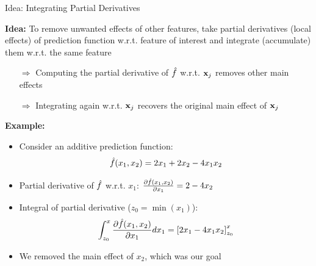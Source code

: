 \documentclass[10pt,compress,t,notes=noshow, xcolor=table]{beamer}
\begin{document}
\begin{frame}{Idea: Integrating Partial Derivatives}

\textbf{Idea:} To remove unwanted effects of other features, take partial derivatives (local effects) of prediction function w.r.t. feature of interest and integrate (accumulate) them w.r.t. the same feature

\begin{itemize}
\item[$\Rightarrow$] Computing the partial derivative of $\hat{f}$ w.r.t. $\mathbf{x}_j$ removes other main effects
\item[$\Rightarrow$] Integrating again w.r.t. $\mathbf{x}_j$ recovers the original main effect of $\mathbf{x}_j$
\end{itemize}

\pause %

\textbf{Example:}
\begin{itemize}[<+->]
\item Consider an additive prediction function: $$\hat{f}(x_1, x_2) = 2x_1 + 2x_2 - 4x_1 x_2$$
\item Partial derivative of $\hat{f}$ w.r.t. $x_1$:
$\frac{\partial \hat{f}(x_1, x_2)}{\partial x_1} = 2 - 4x_2$
\item Integral of partial derivative ($z_0 = \min(x_1)$):
$$\int_{z_0}^{x} \frac{\partial \hat{f}(x_1, x_2)}{\partial x_1} dx_1 = \left[2x_1 - 4x_1 x_2\right]_{z_0}^{x}$$
\item We removed the main effect of $x_2$, which was our goal %
\end{itemize}
\end{frame}
    

\endlecture
\end{document}
